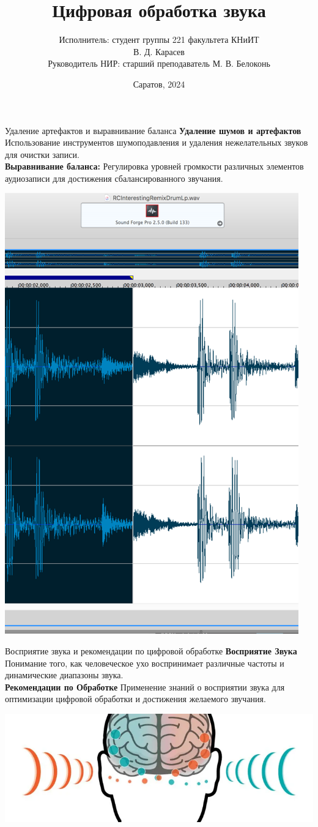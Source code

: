 \documentclass{beamer}
\title[Цифровая обработка звука]{Цифровая обработка звука}
\author[В. Д. Карасев]{Исполнитель: студент группы 221 факультета КНиИТ \\ В. Д. Карасев \\ Руководитель НИР: старший преподаватель М. В. Белоконь}
\institute[Саратов]{Саратовский государственный университет}
\date{Саратов, 2024}
\begin{document}
\begin{frame}
    \titlepage
\end{frame}

\begin{frame}{Удаление артефактов и выравнивание баланса}
    \textbf{Удаление шумов и артефактов} Использование инструментов шумоподавления и удаления нежелательных звуков для очистки записи. \\
    \vspace{0.3cm}
    \textbf{Выравнивание баланса:} Регулировка уровней громкости различных элементов аудиозаписи для достижения сбалансированного звучания. \\
    \begin{center}
        \includegraphics[width=0.6\linewidth]{pic1.png} %
    \end{center}
\end{frame}

\begin{frame}{Восприятие звука и рекомендации по цифровой обработке}
    \textbf{Восприятие Звука} Понимание того, как человеческое ухо воспринимает различные частоты и динамические диапазоны звука. \\
    \vspace{0.3cm}
    \textbf{Рекомендации по Обработке} Применение знаний о восприятии звука для оптимизации цифровой обработки и достижения желаемого звучания. \\
    \begin{center}
        \includegraphics[width=0.6\linewidth]{pic2.png} %
    \end{center}
\end{frame}
\end{document}
